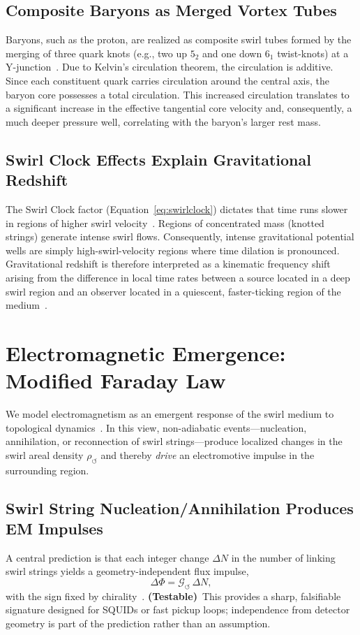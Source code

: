 \documentclass[10pt,reprint,aps,onecolumn,nofootinbib]{revtex4-2}
\newcommand{\testable}{\textbf{(Testable)}}
\begin{document}
    \subsection*{Composite Baryons as Merged Vortex Tubes}
        Baryons, such as the proton, are realized as composite swirl tubes formed by the merging of three quark knots (e.g., two up $5_2$ and one down $6_1$ twist-knots) at a Y-junction~\cite{chiralSwirl}. Due to Kelvin's circulation theorem, the circulation is additive. Since each constituent quark carries circulation around the central axis, the baryon core possesses a total circulation. This increased circulation translates to a significant increase in the effective tangential core velocity and, consequently, a much deeper pressure well, correlating with the baryon's larger rest mass.

    \subsection*{Swirl Clock Effects Explain Gravitational Redshift}
        The Swirl Clock factor (Equation~\ref{eq:swirlclock}) dictates that time runs slower in regions of higher swirl velocity~\cite{sstCanon}. Regions of concentrated mass (knotted strings) generate intense swirl flows. Consequently, intense gravitational potential wells are simply high-swirl-velocity regions where time dilation is pronounced. Gravitational redshift is therefore interpreted as a kinematic frequency shift arising from the difference in local time rates between a source located in a deep swirl region and an observer located in a quiescent, faster-ticking region of the medium~\cite{sstCanon}.

\section{Electromagnetic Emergence: Modified Faraday Law}\label{sec:em}
We model electromagnetism as an emergent response of the swirl medium to topological dynamics~\cite{EM_G}. In this view, non-adiabatic events—nucleation, annihilation, or reconnection of swirl strings—produce localized changes in the swirl areal density $\rho_{\circlearrowleft}$ and thereby \emph{drive} an electromotive impulse in the surrounding region.

    \subsection*{Swirl String Nucleation/Annihilation Produces EM Impulses}\label{subsec:em_g}
        A central prediction is that each integer change $\Delta N$ in the number of linking swirl strings yields a geometry-independent flux impulse,
        \[
            \Delta\Phi = \mathcal{G}_{\circlearrowleft} \,\Delta N,
        \]
        with the sign fixed by chirality~\cite{EM_G}. \testable\ This provides a sharp, falsifiable signature designed for SQUIDs or fast pickup loops; independence from detector geometry is part of the prediction rather than an assumption.
\end{document}

